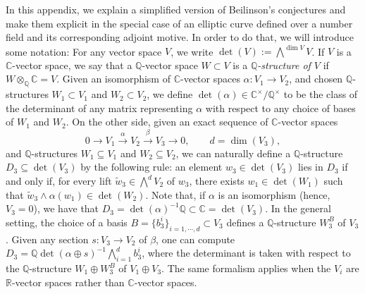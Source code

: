 \documentclass{amsart}
\theoremstyle{definition}
\theoremstyle{remark}
\numberwithin{equation}{section}
\newcommand{\Q}{{\mathbb Q}}
\newcommand{\C}{{\mathbb C}}
\newcommand{\R}{{\mathbb R}}
\begin{document}
In this appendix, we explain a simplified version of Beilinson's conjectures and make them explicit in the special case of an elliptic curve defined over a number field and its corresponding adjoint motive. In order to do that, we will introduce some notation: For any vector space $V$, we write $\det(V):=\bigwedge^{\dim V}V$. If $V$ is a $\C$-vector space, we say that a $\Q$-vector space $W\subset V$ is a \emph{$\Q$-structure of $V$} if $W\otimes_\Q\C=V$. Given an isomorphism of $\C$-vector spaces $\alpha: V_1 \to V_2$, and chosen $\Q$-structures $W_1 \subset V_1$ and $W_2 \subset V_2$, we define $\det(\alpha) \in \C^\times / \Q^\times$ to be the class of the determinant of any matrix representing $\alpha$ with respect to any choice of bases of $W_1$ and $W_2$. On the other side, given an exact sequence of \( \mathbb{C} \)-vector spaces
\[
0 \longrightarrow V_1 \stackrel{\alpha}{\longrightarrow} V_2 \stackrel{\beta}{\longrightarrow} V_3 \longrightarrow 0,\qquad d=\dim(V_3),
\]
and \( \mathbb{Q} \)-structures \( W_1 \subseteq V_1 \) and \( W_2 \subseteq V_2 \), we can naturally define a \( \mathbb{Q} \)-structure \( D_3 \subseteq \det(V_3) \) by the following rule: an element \( w_3 \in \det(V_3) \) lies in \( D_3 \) if and only if, for every lift \( \tilde{w}_3 \in \bigwedge^{d} V_2 \) of \( w_3 \), there exists \( w_1 \in \det(W_1) \) such that \( \tilde{w}_3 \wedge \alpha(w_1) \in \det(W_2) \). Note that, if $\alpha$ is an isomorphism (hence, $V_3=0$), we have that $D_3=\det(\alpha)^{-1}\Q\subset \C=\det (V_3)$. In the general setting, the choice of a basis $B=\{b_3^i\}_{i=1,\cdots,d}\subset V_3$ defines a $\Q$-structure $W_3^{B}$ of $V_3$. Given any section $s:V_3\rightarrow V_2$ of $\beta$, one can compute $D_3=\Q\det(\alpha\oplus s)^{-1}\bigwedge_{i=1}^{d}b_3^i$, where the determinant is taken with respect to the $\Q$-structure $W_1\oplus W_3^B$ of $V_1\oplus V_3$.
The same formalism applies when the $V_i$ are $\R$-vector spaces rather than $\C$-vector spaces.
\end{document}
